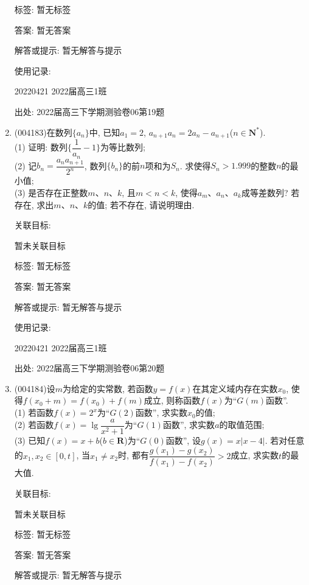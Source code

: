 \documentclass[10pt,a4paper]{article}
\begin{document}
\begin{enumerate}[1.]
标签: 暂无标签

答案: 暂无答案

解答或提示: 暂无解答与提示

使用记录:

20220421	2022届高三1班		


出处: 2022届高三下学期测验卷06第19题
\item { (004183)}在数列$\{a_n\}$中, 已知$a_1=2$, $a_{n+1}a_n=2a_n-a_{n+1}$($n\in \mathbf{N}^*$).\\
(1) 证明: 数列$\{\dfrac 1{a_n}-1\}$为等比数列;\\
(2) 记$b_n=\dfrac{a_na_{n+1}}{2^n}$, 数列$\{b_n\}$的前$n$项和为$S_n$. 求使得$S_n>1.999$的整数$n$的最小值;\\
(3) 是否存在正整数$m$、$n$、$k$, 且$m<n<k$, 使得$a_m$、$a_n$、$a_k$成等差数列? 若存在, 求出$m$、$n$、$k$的值; 若不存在, 请说明理由.


关联目标:

暂未关联目标



标签: 暂无标签

答案: 暂无答案

解答或提示: 暂无解答与提示

使用记录:

20220421	2022届高三1班			


出处: 2022届高三下学期测验卷06第20题
\item { (004184)}设$m$为给定的实常数, 若函数$y=f(x)$在其定义域内存在实数$x_0$, 使得$f(x_0+m)=f(x_0)+f(m)$成立, 则称函数$f(x)$为``$G(m)$函数''.\\
(1) 若函数$f(x)=2^x$为``$G(2)$函数'', 求实数$x_0$的值;\\
(2) 若函数$f(x)=\lg \dfrac a{x^2+1}$为``$G(1)$函数'', 求实数$a$的取值范围;\\
(3) 已知$f(x)=x+b$($b\in \mathbf{R}$)为``$G(0)$函数'', 设$g(x)=x|x-4|$. 若对任意的$x_1,x_2\in[0,t]$, 当$x_1\ne x_2$时, 都有$\dfrac{g(x_1)-g(x_2)}{f(x_1)-f(x_2)}>2$成立, 求实数$t$的最大值.


关联目标:

暂未关联目标



标签: 暂无标签

答案: 暂无答案

解答或提示: 暂无解答与提示


\end{enumerate}
\end{document}
